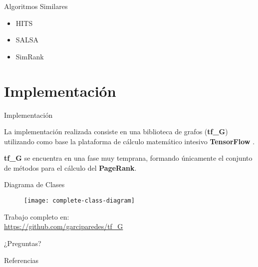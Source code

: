 \documentclass[12pt]{beamer}
\begin{document}
    \begin{frame}[fragile]{Algoritmos Similares}

      \begin{itemize}
        \item HITS \cite{kleinberg1999authoritative}
        \item SALSA \cite{lempel2001salsa}
        \item SimRank \cite{jeh2002simrank}
      \end{itemize}

    \end{frame}

  \section{Implementación}


    \begin{frame}[fragile]{Implementación}

      La implementación realizada consiste en una biblioteca de grafos (\textbf{tf\_G}) utilizando como base la plataforma de cálculo matemático intesivo \textbf{TensorFlow} \cite{abadi2016tensorflow}.

      \textbf{tf\_G} se encuentra en una fase muy temprana, formando únicamente el conjunto de métodos para el cálculo del \textbf{PageRank}.

    \end{frame}

    \begin{frame}[fragile]{Diagrama de Clases}

      \begin{figure}
        \texttt{[image: complete-class-diagram]}
        \caption{}
      \end{figure}

    \end{frame}


    \begin{frame}[standout]
      Trabajo completo en: \\
      \small\url{https://github.com/garciparedes/tf_G}
    \end{frame}

  \begin{frame}[standout]
    ¿Preguntas?
  \end{frame}


  \begin{frame}[allowframebreaks]{Referencias}

    
    

  \end{frame}
\end{document}
